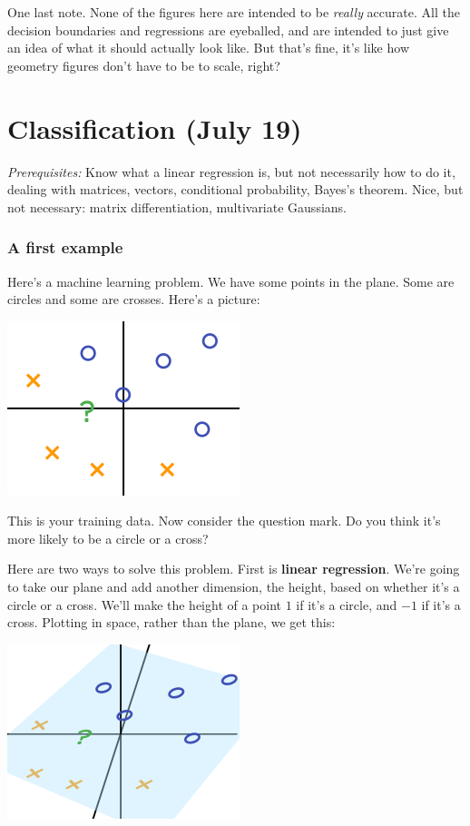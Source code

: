 \documentclass[11pt,paper=letter]{scrartcl}
\begin{document}
One last note. None of the figures here are intended to be \textit{really} accurate. All the decision boundaries and regressions are eyeballed, and are intended to just give an idea of what it should actually look like. But that's fine, it's like how geometry figures don't have to be to scale, right?

\clearpage

\section{Classification (July 19)}

\textit{Prerequisites:} Know what a linear regression is, but not necessarily how to do it, dealing with matrices, vectors, conditional probability, Bayes's theorem. Nice, but not necessary: matrix differentiation, multivariate Gaussians.

\subsubsection*{A first example}

Here's a machine learning problem. We have some points in the plane. Some are circles and some are crosses. Here's a picture:

\begin{center}
\includegraphics[height=2in]{1.png}
\end{center}

This is your training data. Now consider the question mark. Do you think it's more likely to be a circle or a cross?

Here are two ways to solve this problem. First is \textbf{linear regression}. We're going to take our plane and add another dimension, the height, based on whether it's a circle or a cross. We'll make the height of a point $1$ if it's a circle, and $-1$ if it's a cross. Plotting in space, rather than the plane, we get this:

\begin{center}
\includegraphics[height=2in]{2.png}
\end{center}
\end{document}
